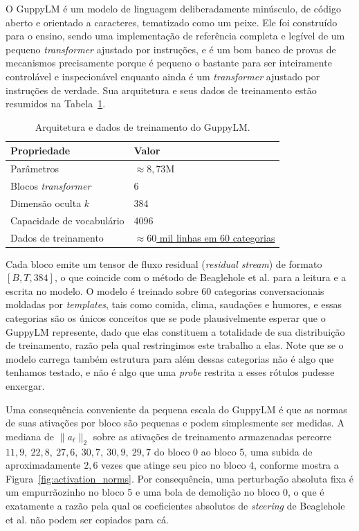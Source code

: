 O GuppyLM é um modelo de linguagem deliberadamente minúsculo, de código aberto e orientado
a caracteres, tematizado como um peixe. Ele foi construído para o ensino, sendo uma
implementação de referência completa e legível de um pequeno \textit{transformer} ajustado
por instruções, e é um bom banco de provas de mecanismos precisamente porque é pequeno o
bastante para ser inteiramente controlável e inspecionável enquanto ainda é um
\textit{transformer} ajustado por instruções de verdade. Sua arquitetura e seus dados de
treinamento estão resumidos na Tabela~\ref{tab:guppylm_properties}.

\begin{table}[htbp]
\centering
\caption{Arquitetura e dados de treinamento do GuppyLM.}
\label{tab:guppylm_properties}
\begin{tabular}{l l}
\toprule
\textbf{Propriedade} & \textbf{Valor} \\
\midrule
Parâmetros &  $\approx 8{,}73$M \\
Blocos \textit{transformer} & 6 \\
Dimensão oculta $k$ & 384 \\
Capacidade de vocabulário & 4096 \\
Dados de treinamento & \href{https://huggingface.co/datasets/arman-bd/guppylm-60k-generic}{$\approx 60$ mil linhas em 60 categorias} \\
\bottomrule
\end{tabular}
\end{table}

Cada bloco emite um tensor de fluxo residual (\textit{residual stream}) de formato
$[B, T, 384]$, o que coincide com o método de Beaglehole et al. para a leitura e a escrita
no modelo. O modelo é treinado sobre 60 categorias conversacionais moldadas por
\textit{templates}, tais como comida, clima, saudações e humores, e essas categorias são
os únicos conceitos que se pode plausivelmente esperar que o GuppyLM represente, dado que
elas constituem a totalidade de sua distribuição de treinamento, razão pela qual
restringimos este trabalho a elas. Note que se o modelo carrega também estrutura para
além dessas categorias não é algo que tenhamos testado, e não é algo que uma
\textit{probe} restrita a esses rótulos pudesse enxergar.

Uma consequência conveniente da pequena escala do GuppyLM é que as normas de suas
ativações por bloco são pequenas e podem simplesmente ser medidas. A mediana de
$\|a_\ell\|_2$ sobre as ativações de treinamento armazenadas percorre
$11{,}9,\ 22{,}8,\ 27{,}6,\ 30{,}7,\ 30{,}9,\ 29{,}7$ do bloco 0 ao bloco 5, uma subida de
aproximadamente $2{,}6$ vezes que atinge seu pico no bloco 4, conforme mostra a
Figura~\ref{fig:activation_norms}. Por consequência, uma perturbação absoluta fixa é um
empurrãozinho no bloco 5 e uma bola de demolição no bloco 0, o que é exatamente a razão
pela qual os coeficientes absolutos de \textit{steering} de Beaglehole et al. não podem ser
copiados para cá.

